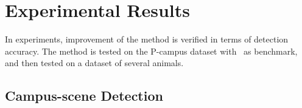 \section{Experimental Results}
\label{ex4}
In experiments, improvement of the method is verified in terms of detection accuracy. The method is tested on the P-campus dataset with~\cite{ac9} as benchmark, and then tested on a dataset of several animals.
\subsection{ Campus-scene Detection }
\begin{figure}
\centering
{}
\end{figure}
